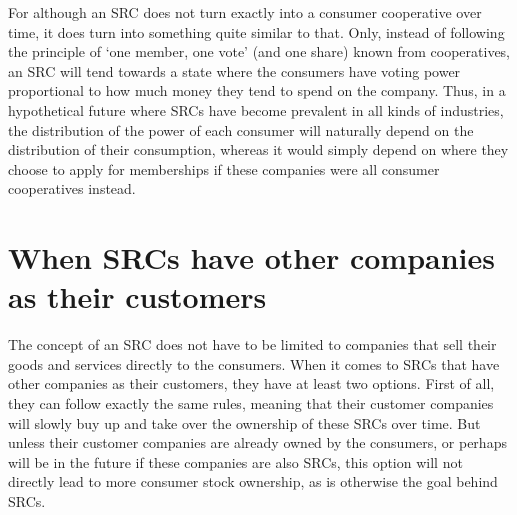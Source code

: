 \documentclass{article}
\begin{document}
For although an SRC does not turn exactly into a consumer cooperative over time, it does turn into something quite similar to that. Only, instead of following the principle of `one member, one vote' (and one share) known from cooperatives, an SRC will tend towards a state where the consumers have voting power proportional to how much money they tend to spend on the company. %
%
%
Thus, in a hypothetical future where SRCs have become prevalent in all kinds of industries, the distribution of the power of each consumer will naturally depend on the distribution of their consumption, whereas it would simply depend on where they choose to apply for %
memberships if these companies were all consumer cooperatives instead.


\section{When SRCs have other companies as their customers}
\label{sect_B2B}

The concept of an SRC does not have to be limited to companies that sell their goods and services directly to the consumers. When it comes to SRCs that have other companies as their customers, they have at least two options. First of all, they can follow exactly the same rules, meaning that their customer companies will slowly buy up and take over the ownership of these SRCs over time. But unless their customer companies are already owned by the consumers, or perhaps will be in the future if these companies are also SRCs, this option will not directly lead to more consumer stock ownership, as is otherwise the goal behind SRCs. 
\end{document}
